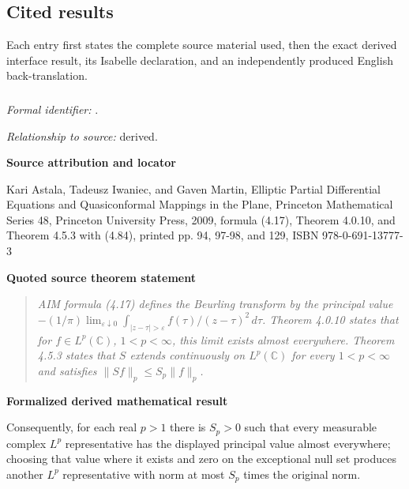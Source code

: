 \documentclass[10pt,oneside]{article}
\newenvironment{sourcequote}{\begin{quote}\itshape}{\end{quote}}
\newcommand{\reviewlabel}[1]{\par\smallskip\noindent\textsf{\bfseries #1}\par\smallskip}
\begin{document}
\subsection{Cited results}
Each entry first states the complete source material used, then the exact
derived interface result, its Isabelle declaration, and an independently
produced English back-translation.
\subsubsection{\texttt{}}
\noindent\textit{Formal identifier:} \texttt{}.\par
\noindent\textit{Relationship to source:} derived.

\reviewlabel{Source attribution and locator}
Kari Astala, Tadeusz Iwaniec, and Gaven Martin, Elliptic Partial Differential Equations and Quasiconformal Mappings in the Plane, Princeton Mathematical Series 48, Princeton University Press, 2009, formula (4.17), Theorem 4.0.10, and Theorem 4.5.3 with (4.84), printed pp. 94, 97-98, and 129, ISBN 978-0-691-13777-3

\reviewlabel{Quoted source theorem statement}
\begin{sourcequote}
AIM formula (4.17) defines the Beurling transform by the principal value $-(1/\pi)\lim_{\varepsilon\downarrow0}\int_{|z-\tau|>\varepsilon} f(\tau)/(z-\tau)^2\,d\tau$. Theorem 4.0.10 states that for $f\in L^p(\mathbb C)$, $1<p<\infty$, this limit exists almost everywhere. Theorem 4.5.3 states that $S$ extends continuously on $L^p(\mathbb C)$ for every $1<p<\infty$ and satisfies $\|Sf\|_p\leq S_p\|f\|_p$.
\end{sourcequote}

\reviewlabel{Formalized derived mathematical result}
Consequently, for each real $p>1$ there is $S_p>0$ such that every measurable complex $L^p$ representative has the displayed principal value almost everywhere; choosing that value where it exists and zero on the exceptional null set produces another $L^p$ representative with norm at most $S_p$ times the original norm.
\end{document}
